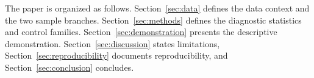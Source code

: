 The paper is organized as follows. Section~\ref{sec:data} defines the data
context and the two sample branches. Section~\ref{sec:methods} defines the
diagnostic statistics and control families. Section~\ref{sec:demonstration}
presents the descriptive demonstration. Section~\ref{sec:discussion} states
limitations, Section~\ref{sec:reproducibility} documents reproducibility,
and Section~\ref{sec:conclusion} concludes.



